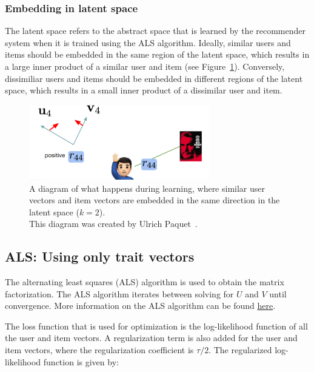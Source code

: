\documentclass{article}
\begin{document}
\newpage

\subsubsection{Embedding in latent space}
The latent space refers to the abstract space that is learned by the recommender system when it is trained using the ALS algorithm.
Ideally, similar users and items should be embedded in the same region of the latent space,
which results in a large inner product of a similar user and item (see Figure~\ref{awe}).
Conversely, dissimiliar users and items should be embedded in different regions of the latent space, 
which results in a small inner product of a dissimilar user and item.

\begin{figure}[h!]
    \centering
    \captionsetup{justification=centering}
    \includegraphics[width=0.7\textwidth]{graphics/awe.png}
    \caption{A diagram of what happens during learning, where similar user vectors and item vectors are 
    embedded in the same direction in the latent space ($k = 2$). \\This diagram was created by Ulrich Paquet~\cite{Ula}.}
    \label{awe}
\end{figure}

\newpage


\subsection{ALS: Using only trait vectors}
The alternating least squares (ALS) algorithm is used to obtain the matrix factorization. The ALS algorithm 
iterates between solving for $U$ and $V$ until convergence. More information on the ALS algorithm can be found
\href{}{here}.

The loss function that is used for optimization is the log-likelihood function of all the user and item vectors.
A regularization term is also added for the user and item vectors, where the regularization coefficient is $\tau/2$. 
The regularized log-likelihood function is given by:
\end{document}
